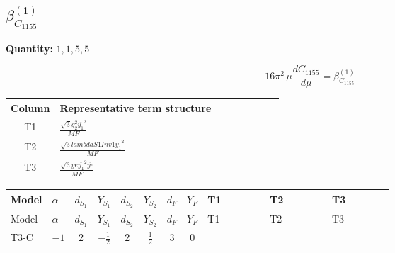 \documentclass[8pt]{article}
\begin{document}
\begin{landscape}
\section*{$\beta_{C_{1155}}^{(1)}$}
\noindent\textbf{Quantity: }$\mathrm{1,1,5,5}$\par\smallskip
\[16\pi^2\,\mu\frac{d C_{1155}}{d\mu}=\beta_{C_{1155}}^{(1)}\]
\begin{center}
\begin{tabular}{@{}c >{\raggedright\arraybackslash}p{0.82\linewidth}@{}}
\toprule
Column & Representative term structure \\
\midrule
T1 & \(\displaystyle \frac{\sqrt{3} g_{2}^{2} \overline{y_{1}}^{2}}{MF}\) \\
\midrule
T2 & \(\displaystyle \frac{\sqrt{3} lambdaS1Inv1 \overline{y_{1}}^{2}}{MF}\) \\
\midrule
T3 & \(\displaystyle \frac{\sqrt{3} ye \overline{y_{1}}^{2} \overline{ye}}{MF}\) \\
\midrule
\bottomrule
\end{tabular}
\end{center}
\smallskip
\tiny
\begin{longtable}{@{}llcccccc >{\raggedright\arraybackslash}p{0.21\linewidth} >{\raggedright\arraybackslash}p{0.21\linewidth} >{\raggedright\arraybackslash}p{0.21\linewidth}@{}}
\toprule
Model & $\alpha$ & $d_{S_1}$ & $Y_{S_1}$ & $d_{S_2}$ & $Y_{S_2}$ & $d_F$ & $Y_F$ & T1 & T2 & T3 \\
\midrule
\endfirsthead
\toprule
Model & $\alpha$ & $d_{S_1}$ & $Y_{S_1}$ & $d_{S_2}$ & $Y_{S_2}$ & $d_F$ & $Y_F$ & T1 & T2 & T3 \\
\midrule
\endhead
T3-C & $-1$ & $2$ & $-\frac{1}{2}$ & $2$ & $\frac{1}{2}$ & $3$ & $0$ & \scriptsize\adjustbox{max width=\linewidth}{$\begin{gathered} - \frac{\sqrt{3} g_{2}^{2} \overline{y_{1}}^{2}}{4 MF}\end{gathered}$} & \scriptsize\adjustbox{max width=\linewidth}{$\begin{gathered} - \frac{\sqrt{3} lambdaS1Inv1 \overline{y_{1}}^{2}}{6 MF}\end{gathered}$} & \scriptsize\adjustbox{max width=\linewidth}{$\begin{gathered} \frac{\sqrt{3} ye \overline{y_{1}}^{2} \overline{ye}}{12 MF}\end{gathered}$} \\
\midrule
\bottomrule
\end{longtable}
\clearpage

\end{landscape}
\end{document}
